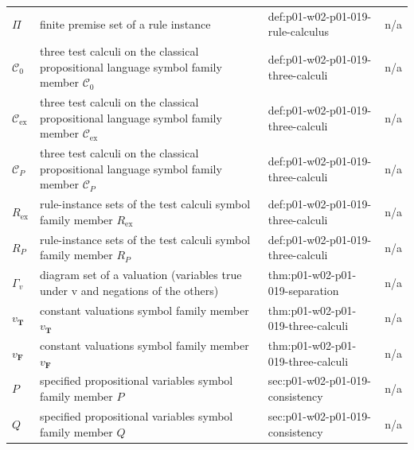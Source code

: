 \begin{longtable}{@{}p{}p{}p{}p{}@{}}
\(\Pi\) & finite premise set of a rule instance & def:\allowbreak{}p01-\allowbreak{}w02-\allowbreak{}p01-\allowbreak{}019-\allowbreak{}rule-\allowbreak{}calculus & n/a \\
\(\mathcal C_0\) & three test calculi on the classical propositional language symbol family member \(\mathcal C_0\) & def:\allowbreak{}p01-\allowbreak{}w02-\allowbreak{}p01-\allowbreak{}019-\allowbreak{}three-\allowbreak{}calculi & n/a \\
\(\mathcal C_{\mathrm{ex}}\) & three test calculi on the classical propositional language symbol family member \(\mathcal C_{\mathrm{ex}}\) & def:\allowbreak{}p01-\allowbreak{}w02-\allowbreak{}p01-\allowbreak{}019-\allowbreak{}three-\allowbreak{}calculi & n/a \\
\(\mathcal C_P\) & three test calculi on the classical propositional language symbol family member \(\mathcal C_P\) & def:\allowbreak{}p01-\allowbreak{}w02-\allowbreak{}p01-\allowbreak{}019-\allowbreak{}three-\allowbreak{}calculi & n/a \\
\(R_{\mathrm{ex}}\) & rule-instance sets of the test calculi symbol family member \(R_{\mathrm{ex}}\) & def:\allowbreak{}p01-\allowbreak{}w02-\allowbreak{}p01-\allowbreak{}019-\allowbreak{}three-\allowbreak{}calculi & n/a \\
\(R_P\) & rule-instance sets of the test calculi symbol family member \(R_P\) & def:\allowbreak{}p01-\allowbreak{}w02-\allowbreak{}p01-\allowbreak{}019-\allowbreak{}three-\allowbreak{}calculi & n/a \\
\(\Gamma_v\) & diagram set of a valuation (variables true under v and negations of the others) & thm:\allowbreak{}p01-\allowbreak{}w02-\allowbreak{}p01-\allowbreak{}019-\allowbreak{}separation & n/a \\
\(v_{\mathbf T}\) & constant valuations symbol family member \(v_{\mathbf T}\) & thm:\allowbreak{}p01-\allowbreak{}w02-\allowbreak{}p01-\allowbreak{}019-\allowbreak{}three-\allowbreak{}calculi & n/a \\
\(v_{\mathbf F}\) & constant valuations symbol family member \(v_{\mathbf F}\) & thm:\allowbreak{}p01-\allowbreak{}w02-\allowbreak{}p01-\allowbreak{}019-\allowbreak{}three-\allowbreak{}calculi & n/a \\
\(P\) & specified propositional variables symbol family member \(P\) & sec:\allowbreak{}p01-\allowbreak{}w02-\allowbreak{}p01-\allowbreak{}019-\allowbreak{}consistency & n/a \\
\(Q\) & specified propositional variables symbol family member \(Q\) & sec:\allowbreak{}p01-\allowbreak{}w02-\allowbreak{}p01-\allowbreak{}019-\allowbreak{}consistency & n/a \\

\end{longtable}
